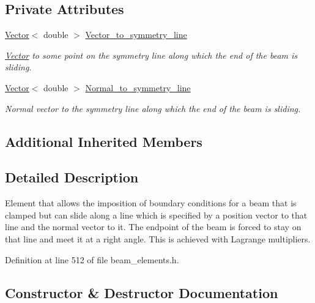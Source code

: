 \subsection*{Private Attributes}
\begin{DoxyCompactItemize}
\item 
\hyperlink{classoomph_1_1Vector}{Vector}$<$ double $>$ \hyperlink{classoomph_1_1ClampedSlidingHermiteBeamBoundaryConditionElement_a351c0fdcef2a4b998dbde483ce76ef5d}{Vector\+\_\+to\+\_\+symmetry\+\_\+line}
\begin{DoxyCompactList}\small\item\em \hyperlink{classoomph_1_1Vector}{Vector} to some point on the symmetry line along which the end of the beam is sliding. \end{DoxyCompactList}\item 
\hyperlink{classoomph_1_1Vector}{Vector}$<$ double $>$ \hyperlink{classoomph_1_1ClampedSlidingHermiteBeamBoundaryConditionElement_aa4bdf8a594367b91fd9ce7c0111ed543}{Normal\+\_\+to\+\_\+symmetry\+\_\+line}
\begin{DoxyCompactList}\small\item\em Normal vector to the symmetry line along which the end of the beam is sliding. \end{DoxyCompactList}\end{DoxyCompactItemize}
\subsection*{Additional Inherited Members}


\subsection{Detailed Description}
Element that allows the imposition of boundary conditions for a beam that is clamped but can slide along a line which is specified by a position vector to that line and the normal vector to it. The endpoint of the beam is forced to stay on that line and meet it at a right angle. This is achieved with Lagrange multipliers. 

Definition at line 512 of file beam\+\_\+elements.\+h.



\subsection{Constructor \& Destructor Documentation}
\mbox{\label{classoomph_1_1ClampedSlidingHermiteBeamBoundaryConditionElement_ab69f027e05df4ecd7374f8026832e2db}} 
